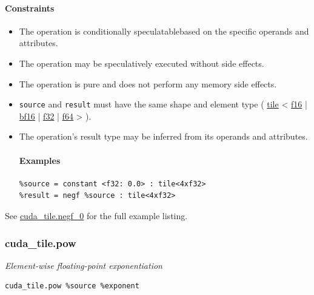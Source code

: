 \documentclass{article}
\begin{document}
\paragraph{Constraints}

\begin{itemize}
\item The operation is conditionally speculatablebased on the specific operands and attributes.
\item The operation may be speculatively executed without side effects.
\item The operation is pure and does not perform any memory side effects.
\item \texttt{source} and \texttt{result} must have the same shape and element type ( \href{https://docs.nvidia.com/cuda/tile-ir/latest/sections/types.html#type-tile}{tile} < \href{https://docs.nvidia.com/cuda/tile-ir/latest/sections/types.html#subsection-element-types}{f16} | \href{https://docs.nvidia.com/cuda/tile-ir/latest/sections/types.html#subsection-element-types}{bf16} | \href{https://docs.nvidia.com/cuda/tile-ir/latest/sections/types.html#subsection-element-types}{f32} | \href{https://docs.nvidia.com/cuda/tile-ir/latest/sections/types.html#subsection-element-types}{f64} > ).
\item The operation's result type may be inferred from its operands and attributes.


\paragraph{Examples}

\begin{lstlisting}
%source = constant <f32: 0.0> : tile<4xf32>
%result = negf %source : tile<4xf32>
\end{lstlisting}

\end{itemize}
See \href{https://docs.nvidia.com/cuda/tile-ir/latest/sections/appendix.html#example-cuda-tile-negf-0}{cuda\_tile.negf\_0} for the full example listing.



\subsubsection{cuda\_tile.pow}

\textit{Element-wise floating-point exponentiation}


\begin{lstlisting}
cuda_tile.pow %source %exponent
\end{lstlisting}
\end{document}
